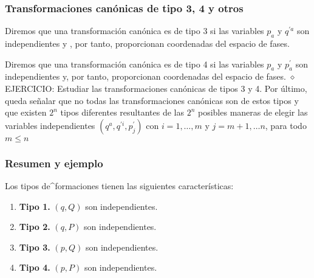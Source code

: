 \subsubsection{Transformaciones canónicas de tipo 3, 4 y otros}
Diremos que una transformación canónica es de tipo 3 si las variables $p_{a}$ y $q^{\prime a}$ son independientes y , por tanto, proporcionan coordenadas del espacio de fases.

Diremos que una transformación canónica es de tipo 4 si las variables $p_{a}$ y $p_{a}^{\prime}$ son independientes y, por tanto, proporcionan coordenadas del espacio de fases.
$\diamond$ EJERCICIO: Estudiar las transformaciones canónicas de tipos 3 y 4.
Por último, queda señalar que no todas las transformaciones canónicas son de estos tipos y que existen $2^{n}$ tipos diferentes resultantes de las $2^{n}$ posibles maneras de elegir las variables independientes $\left(q^{a}, q^{\prime i}, p_{j}^{\prime}\right)$ con $i=1, \ldots, m$ y $j=m+1, \ldots n$, para todo $m \leq n$ 
\subsubsection{Resumen y ejemplo}
Los tipos de^\top formaciones tienen las siguientes características: 

\begin{enumerate}
\item \textbf{Tipo 1.} $(q, Q)$ son independientes.
\item \textbf{Tipo 2.} $(q, P)$ son independientes.
\item \textbf{Tipo 3.} $(p, Q)$ son independientes.
\item \textbf{Tipo 4.} $(p, P)$ son independientes. 
\end{enumerate}



